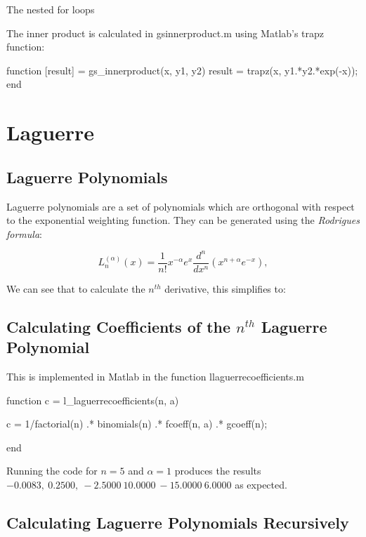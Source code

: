 \documentclass{article}
\begin{document}
The nested for loops %


The inner product is calculated in gs\textunderscore innerproduct.m using Matlab's trapz function:

\begin{code}
function [result] = gs_innerproduct(x, y1, y2)
    result = trapz(x, y1.*y2.*exp(-x));
end
\end{code}

\section{Laguerre}
\subsection{Laguerre Polynomials}

Laguerre polynomials are a set of polynomials which are orthogonal with respect to the exponential weighting function. They can be generated using the \emph{Rodrigues formula}:

$$
L_n^{(\alpha)}(x) = \frac{1}{n!} x^{-\alpha} e^x \frac{d^n}{dx^n}(x^{n+\alpha} e^{-x}),  %
$$

We can see that to calculate the $n^{th}$ derivative, this simplifies to:


\subsection{Calculating Coefficients of the $n^{th}$ Laguerre Polynomial}

This is implemented in Matlab in the function l\textunderscore laguerrecoefficients.m

\begin{code}
function c = l_laguerrecoefficients(n, a)
    
    c = 1/factorial(n) .* binomials(n) .* fcoeff(n, a) .* gcoeff(n);
    
end
\end{code}

Running the code for $ n = 5 $ and $ \alpha = 1 $ produces the results $-0.0083,\  0.2500,\  -2.5000\  10.0000\  -15.0000\  6.0000$ as expected. 

\subsection{Calculating Laguerre Polynomials Recursively}
\end{document}
